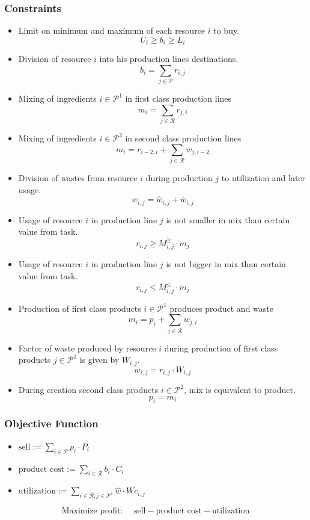 \subsubsection*{Constraints}
\begin{itemize}
    \item Limit on minimum and maximum of each resource $i$ to buy.
    $$U_i \geqslant b_i \geqslant L_i$$
    \item Division of resource $i$ into his production lines destinations.
    $$b_i = \sum_{j \in \mathcal{P}} r_{i,j}$$
    \item Mixing of ingredients $i \in \mathcal{P}^1$ in first class production lines
    $$m_i = \sum_{j \in \mathcal{R}} r_{j,i}$$
    \item Mixing of ingredients $i \in \mathcal{P}^2$ in second class production lines
    $$m_i = r_{i-2, i} + \sum_{j \in \mathcal{R}}\overline{w}_{j, i-2}$$
    \item Division of wastes from resource $i$ during production $j$ to utilization and later usage.
    $$w_{i,j} = \hat{w}_{i,j} + \overline{w}_{i,j}$$
    \item Usage of resource $i$ in production line $j$ is not smaller in mix than certain value from task.
    $$r_{i,j} \geqslant M^{\geqslant}_{i,j} \cdot m_{j}$$
    \item Usage of resource $i$ in production line $j$ is not bigger in mix than certain value from task.
    $$r_{i,j} \leqslant M^{\leqslant}_{i,j} \cdot m_{j}$$
    \item Production of first class products $i \in \mathcal{P}^1$ produces product and waste 
    $$m_{i} = p_i + \sum_{j\in \mathcal{R}} w_{j,i}$$
    \item Factor of waste produced by resource $i$ during production of first class products $j \in \mathcal{P}^1$ is given by $W_{i,j}$.
    $$w_{i,j} = r_{i,j} \cdot W_{i,j}$$
    \item During creation second class products $i \in \mathcal{P}^2$, mix is equivalent to product.
    $$p_i = m_i$$
    
\end{itemize}
\subsubsection*{Objective Function}
\begin{itemize}
    \item $\textrm{sell} := \sum_{i \in \mathcal{P}} p_i \cdot P_i $
    \item $\textrm{product cost} := \sum_{i \in \mathcal{R}} b_i \cdot C_i $
    \item $\textrm{utilization} := \sum_{i \in \mathcal{R}, j \in \mathcal{P}^1} \hat{w}\cdot Wc_{i,j}$
\end{itemize}
$$\textrm{Maximize profit: } \quad \textrm{sell} - \textrm{product cost} - \textrm{utilization}$$


